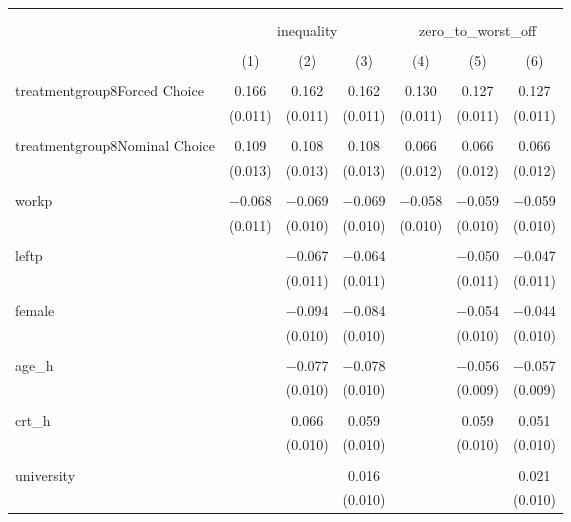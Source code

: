 
\begin{table}[!htbp] \centering 
  \caption{} 
  \label{} 
\begin{tabular}{@{\extracolsep{5pt}}lcccccc} 
\\[-1.8ex]\hline 
\hline \\[-1.8ex] 
\\[-1.8ex] & \multicolumn{3}{c}{inequality} & \multicolumn{3}{c}{zero\_to\_worst\_off} \\ 
\\[-1.8ex] & (1) & (2) & (3) & (4) & (5) & (6)\\ 
\hline \\[-1.8ex] 
 treatmentgroup8Forced Choice & 0.166 & 0.162 & 0.162 & 0.130 & 0.127 & 0.127 \\ 
  & (0.011) & (0.011) & (0.011) & (0.011) & (0.011) & (0.011) \\ 
  & & & & & & \\ 
 treatmentgroup8Nominal Choice & 0.109 & 0.108 & 0.108 & 0.066 & 0.066 & 0.066 \\ 
  & (0.013) & (0.013) & (0.013) & (0.012) & (0.012) & (0.012) \\ 
  & & & & & & \\ 
 workp & $-$0.068 & $-$0.069 & $-$0.069 & $-$0.058 & $-$0.059 & $-$0.059 \\ 
  & (0.011) & (0.010) & (0.010) & (0.010) & (0.010) & (0.010) \\ 
  & & & & & & \\ 
 leftp &  & $-$0.067 & $-$0.064 &  & $-$0.050 & $-$0.047 \\ 
  &  & (0.011) & (0.011) &  & (0.011) & (0.011) \\ 
  & & & & & & \\ 
 female &  & $-$0.094 & $-$0.084 &  & $-$0.054 & $-$0.044 \\ 
  &  & (0.010) & (0.010) &  & (0.010) & (0.010) \\ 
  & & & & & & \\ 
 age\_h &  & $-$0.077 & $-$0.078 &  & $-$0.056 & $-$0.057 \\ 
  &  & (0.010) & (0.010) &  & (0.009) & (0.009) \\ 
  & & & & & & \\ 
 crt\_h &  & 0.066 & 0.059 &  & 0.059 & 0.051 \\ 
  &  & (0.010) & (0.010) &  & (0.010) & (0.010) \\ 
  & & & & & & \\ 
 university &  &  & 0.016 &  &  & 0.021 \\ 
  &  &  & (0.010) &  &  & (0.010) \\ 

\end{tabular}
\end{table}
